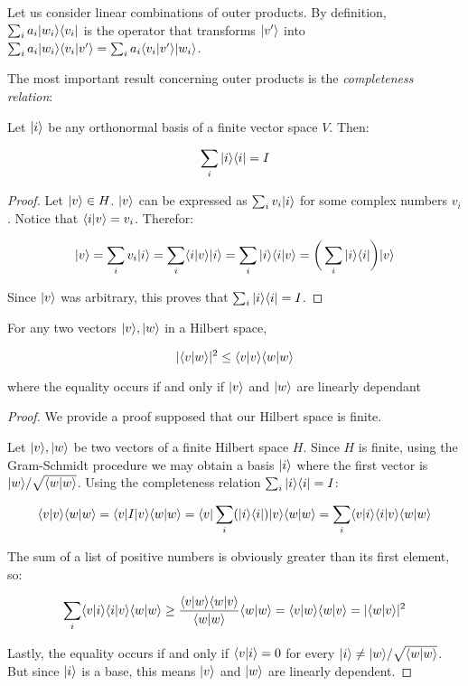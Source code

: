 Let us consider linear combinations of outer products. By definition, $\sum_i a_i |w_i\rangle\langle v_i|$ is the operator that transforms $|v'\rangle$ into $\sum_i a_i |w_i\rangle\langle v_i|v'\rangle = \sum_i a_i \langle v_i|v'\rangle |w_i\rangle$.

The most important result concerning outer products is the \emph{completeness relation}:

\begin{proposition}
	Let $|i\rangle$ be any orthonormal basis of a finite vector space $V$. Then:
	
	$$ \sum_i |i\rangle\langle i| = I $$
\end{proposition}

\begin{proof}
	Let $|v\rangle \in H$. $|v\rangle$ can be expressed as $ \sum_i v_i |i\rangle$ for some complex numbers $v_i$. Notice that $\langle i|v\rangle = v_i$. Therefor:
	
	$$|v\rangle = \sum_i v_i |i\rangle = \sum_i \langle i|v\rangle |i\rangle = \sum_i |i\rangle\langle i|v\rangle = \bigg( \sum_i |i\rangle\langle i|\bigg) |v\rangle$$
	
	Since $|v\rangle$ was arbitrary, this proves that $ \sum_i |i\rangle\langle i | = I $.
\end{proof}

\begin{corollary}
	For any two vectors $|v\rangle, |w\rangle$ in a Hilbert space,
	
	$$|\langle v|w\rangle|^2 \leq \langle v|v\rangle\langle w|w\rangle$$
	
	where the equality occurs if and only if $|v\rangle$ and $|w\rangle$ are linearly dependant
\end{corollary}
\begin{proof} 
	We provide a proof supposed that our Hilbert space is finite.
	
	Let $|v\rangle, |w\rangle$ be two vectors of a finite Hilbert space $H$. Since $H$ is finite, using the Gram-Schmidt procedure we may obtain a basis $|i\rangle$ where the first vector is $|w\rangle / \sqrt{\langle w|w\rangle}$. Using the completeness relation $\sum_i |i\rangle \langle i| = I$:
	
	$$\langle v|v\rangle \langle w|w\rangle = \langle v|I|v\rangle \langle w|w\rangle = \langle v| \sum_i (|i\rangle \langle i|) |v\rangle \langle w|w\rangle = \sum_i \langle v|i\rangle \langle i|v\rangle \langle w|w\rangle $$
	
	The sum of a list of positive numbers is obviously greater than its first element, so:
	
	$$ \sum_i \langle v|i\rangle \langle i|v\rangle \langle w|w\rangle \geq  \frac{\langle v|w\rangle \langle w|v\rangle}{\langle w|w\rangle} \langle w|w\rangle = \langle v|w\rangle \langle w|v\rangle  = | \langle w|v\rangle |^2 $$
	
	Lastly, the equality occurs if and only if $\langle v|i\rangle = 0$ for every $|i\rangle \neq |w\rangle / \sqrt{\langle w|w\rangle}$. But since $|i\rangle$ is a base, this means $|v\rangle$ and $|w\rangle$ are linearly dependent.	
\end{proof}


